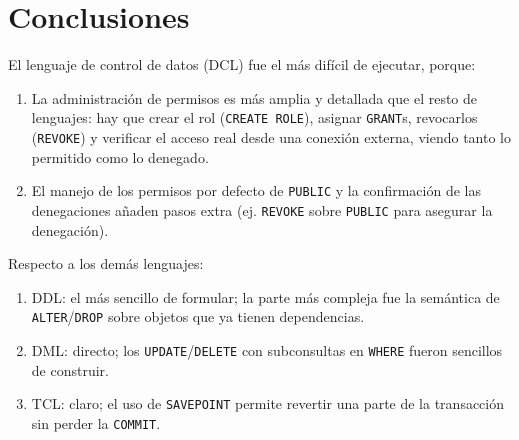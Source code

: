 
\section{Conclusiones}

El lenguaje de control de datos (DCL) fue el más difícil de ejecutar, porque:

\begin{enumerate}
  \item La administración de permisos es más amplia y detallada que el resto de lenguajes: hay que crear el rol (\texttt{CREATE ROLE}), asignar \texttt{GRANT}s, revocarlos (\texttt{REVOKE}) y verificar el acceso real desde una conexión externa, viendo tanto lo permitido como lo denegado.
  \item El manejo de los permisos por defecto de \texttt{PUBLIC} y la confirmación de las denegaciones añaden pasos extra (ej. \texttt{REVOKE} sobre \texttt{PUBLIC} para asegurar la denegación).
\end{enumerate}

Respecto a los demás lenguajes:

\begin{enumerate}
  \item DDL: el más sencillo de formular; la parte más compleja fue la semántica de \texttt{ALTER}/\texttt{DROP} sobre objetos que ya tienen dependencias.
  \item DML: directo; los \texttt{UPDATE}/\texttt{DELETE} con subconsultas en \texttt{WHERE} fueron sencillos de construir.
  \item TCL: claro; el uso de \texttt{SAVEPOINT} permite revertir una parte de la transacción sin perder la \texttt{COMMIT}.
\end{enumerate}
